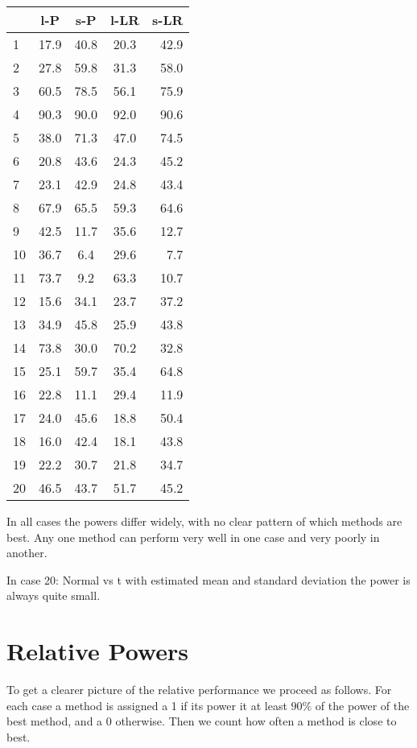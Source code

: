 \documentclass[]{svjour3}
\begin{document}
\begin{table}[H]
\begin{center}
\begin{tabular}{l|c|c|c|r}
 & l-P & s-P & l-LR & s-LR \\
\hline
1 & 17.9 & 40.8 & 20.3 & 42.9 \\
2 & 27.8 & 59.8 & 31.3 & 58.0 \\
3 & 60.5 & 78.5 & 56.1 & 75.9 \\
4 & 90.3 & 90.0 & 92.0 & 90.6 \\
5 & 38.0 & 71.3 & 47.0 & 74.5 \\
6 & 20.8 & 43.6 & 24.3 & 45.2 \\
7 & 23.1 & 42.9 & 24.8 & 43.4 \\
8 & 67.9 & 65.5 & 59.3 & 64.6 \\
9 & 42.5 & 11.7 & 35.6 & 12.7 \\
10 & 36.7 & 6.4 & 29.6 & 7.7 \\
11 & 73.7 & 9.2 & 63.3 & 10.7 \\
12 & 15.6 & 34.1 & 23.7 & 37.2 \\
13 & 34.9 & 45.8 & 25.9 & 43.8 \\
14 & 73.8 & 30.0 & 70.2 & 32.8 \\
15 & 25.1 & 59.7 & 35.4 & 64.8 \\
16 & 22.8 & 11.1 & 29.4 & 11.9 \\
17 & 24.0 & 45.6 & 18.8 & 50.4 \\
18 & 16.0 & 42.4 & 18.1 & 43.8 \\
19 & 22.2 & 30.7 & 21.8 & 34.7 \\
20 & 46.5 & 43.7 & 51.7 & 45.2 \\
\end{tabular}
\end{center}
\end{table}


In all cases the powers differ widely, with no clear pattern of which
methods are best. Any one method can perform very well in one case and
very poorly in another.

In case 20: Normal vs t with estimated mean and standard deviation the power is always quite small.

\section{Relative Powers}

 To get a
clearer picture of the relative performance we proceed as follows. For
each case a method is assigned a 1 if its power it at least \(90\%\) of
the power of the best method, and a 0 otherwise. Then we count how often
a method is close to best.
\end{document}

